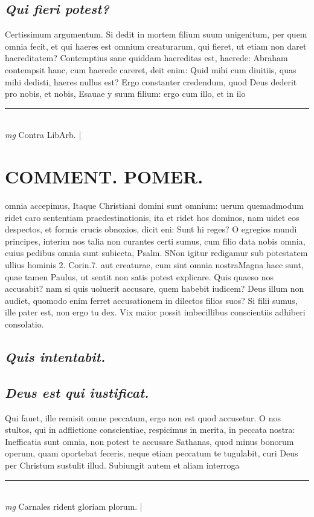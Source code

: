 \documentclass{article}
\begin{document}
\begin{pages}
\subsection*{\textit{Qui fieri potest? }}\pstart Certissimum argumentum. Si dedit in mortem filium suum unigenitum, per quem omnia fecit, et qui haeres est omnium creaturarum, qui fieret, ut etiam non daret haereditatem? Contemptius sane quiddam haereditas est, haerede: Abraham contempsit hanc, cum haerede careret, deit enim: Quid mihi cum diuitiis, quas mihi dedisti, haeres nullus est? Ergo constanter credendum, quod Deus dederit pro nobis, et nobis, Esauae y suum filium: ergo cum illo, et in ilo  \pend
\vspace{0.5cm}\noindent
\vspace{0.2cm}\rule{1cm}{0.2pt}\\ 
\hspace{0.2cm}\textit{mg}
\footnotesize Contra LibArb.  
\normalsize| 
\section*{COMMENT. POMER.  }\pstart omnia accepimus, Itaque Christiani domini sunt omnium: uerum quemadmodum ridet caro sententiam praedestinationis, ita et ridet hos dominos, nam uidet eos despectos, et formis crucis obnoxios, dicit eni: Sunt hi reges? O egregios mundi principes, interim nos talia non curantes certi sumus, cum filio data nobis omnia, cuius pedibus omnia sunt subiecta, Psalm. SNon igitur redigamur sub potestatem ullius hominis 2. Corin.7. aut creaturae, cum sint omnia nostraMagna haec sunt, quae tamen Paulus, ut sentit non satis potest explicare.  \pend\pstart Quis quaeso nos accusabit? nam si quis uoluerit accusare, quem habebit iudicem? Deus illum non audiet, quomodo enim ferret accusationem in dilectos filios suos? Si filii sumus, ille pater est, non ergo tu dex. Vix maior possit imbecillibus conscientiis adhiberi consolatio.   \pend
{}
{}
\subsection*{\textit{Quis intentabit. }}
{}
\subsection*{\textit{Deus est qui iustificat. }}\pstart Qui fauet, ille remisit omne peccatum, ergo non est quod accusetur. O nos stultos, qui in adflictione conscientiae, respicimus in merita, in peccata nostra: Inefficatia sunt omnia, non potest te accusare Sathanas, quod minus bonorum operum, quam oportebat feceris, neque etiam peccatum te tugulabit, curi Deus per Christum sustulit illud. Subiungit autem et aliam interroga  \pend
\vspace{0.5cm}\noindent
\vspace{0.2cm}\rule{1cm}{0.2pt}\\ 
\hspace{0.2cm}\textit{mg}
\footnotesize Carnales rident gloriam plorum.  
\normalsize| 

\end{pages}
\end{document}
